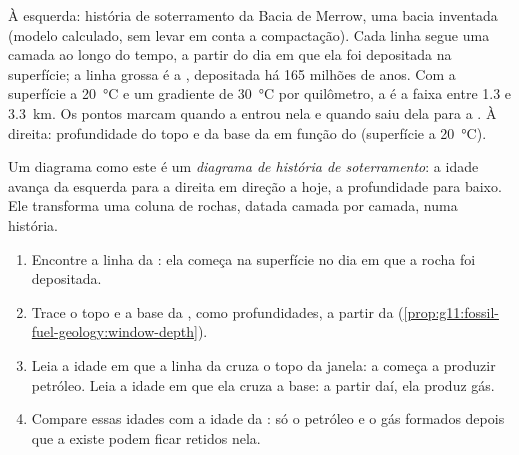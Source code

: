 \begin{omfigure}
{\small À esquerda: história de soterramento da Bacia de Merrow, uma bacia
inventada (modelo calculado, sem levar em conta a compactação). Cada linha
segue uma camada ao longo do tempo, a partir do dia em que ela foi
depositada na superfície; a linha grossa é a , depositada há
165 milhões de anos. Com a superfície a \qty{20}{\degreeCelsius} e um
gradiente de \qty{30}{\degreeCelsius} por quilômetro, a  é
a faixa entre \num{1.3} e \qty{3.3}{km}. Os pontos marcam quando a  entrou nela e quando saiu dela para a . À direita:
profundidade do topo e da base da  em função do  (superfície a \qty{20}{\degreeCelsius}).}
\end{omfigure}

Um diagrama como este é um \emph{diagrama de história de soterramento}: a
idade avança da esquerda para a direita em direção a hoje, a profundidade
para baixo. Ele transforma uma coluna de rochas, datada camada por camada,
numa história.

\begin{method}\label{met:g11:fossil-fuel-geology:burial}
\begin{enumerate}
  \item Encontre a linha da : ela começa na superfície no dia
        em que a rocha foi depositada.
  \item Trace o topo e a base da , como profundidades, a
        partir da  (\cref{prop:g11:fossil-fuel-geology:window-depth}).
  \item Leia a idade em que a linha da  cruza o topo da
        janela: a  começa a produzir petróleo. Leia a idade em
        que ela cruza a base: a partir daí, ela produz gás.
  \item Compare essas idades com a idade da : só o petróleo e o gás
        formados depois que a  existe podem ficar retidos nela.
\end{enumerate}
\end{method}

